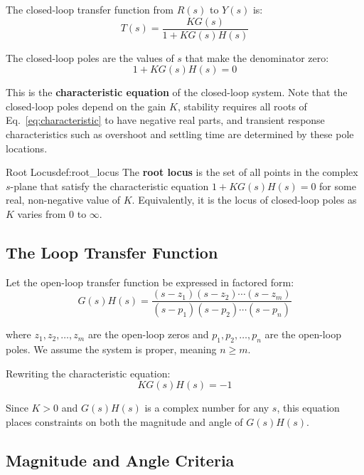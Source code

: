 The closed-loop transfer function from $R(s)$ to $Y(s)$ is:
\begin{equation}
T(s) = \frac{KG(s)}{1 + KG(s)H(s)}
\label{eq:closed_loop_general}
\end{equation}

The closed-loop poles are the values of $s$ that make the denominator zero:
\begin{equation}
\boxed{1 + KG(s)H(s) = 0}
\label{eq:characteristic}
\end{equation}

This is the \textbf{characteristic equation} of the closed-loop system. Note that the closed-loop poles depend on the gain $K$, stability requires all roots of Eq.~\eqref{eq:characteristic} to have negative real parts, and transient response characteristics such as overshoot and settling time are determined by these pole locations.

\begin{definition}{Root Locus}{def:root_locus}
The \textbf{root locus} is the set of all points in the complex $s$-plane that satisfy the characteristic equation $1 + KG(s)H(s) = 0$ for some real, non-negative value of $K$. Equivalently, it is the locus of closed-loop poles as $K$ varies from $0$ to $\infty$.
\end{definition}

\subsection{The Loop Transfer Function}

Let the open-loop transfer function be expressed in factored form:
\begin{equation}
G(s)H(s) = \frac{(s-z_1)(s-z_2)\cdots(s-z_m)}{(s-p_1)(s-p_2)\cdots(s-p_n)}
\label{eq:GH_factored}
\end{equation}

where $z_1, z_2, \ldots, z_m$ are the open-loop zeros and $p_1, p_2, \ldots, p_n$ are the open-loop poles. We assume the system is proper, meaning $n \geq m$.

Rewriting the characteristic equation:
\begin{equation}
KG(s)H(s) = -1
\label{eq:KGH_minus1}
\end{equation}

Since $K > 0$ and $G(s)H(s)$ is a complex number for any $s$, this equation places constraints on both the magnitude and angle of $G(s)H(s)$.

\subsection{Magnitude and Angle Criteria}


